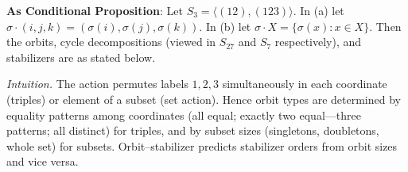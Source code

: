 \documentclass[11pt]{article}
\theoremstyle{definition}
\begin{document}
\noindent\textbf{As Conditional Proposition}: Let $S_3=\langle (12),(123)\rangle$. In (a) let $\sigma\cdot(i,j,k)=(\sigma(i),\sigma(j),\sigma(k))$. In (b) let $\sigma\cdot X=\{\sigma(x):x\in X\}$. Then the orbits, cycle decompositions (viewed in $S_{27}$ and $S_7$ respectively), and stabilizers are as stated below.

\newpage

\dotfill

\emph{Intuition.} The action permutes labels $1,2,3$ simultaneously in each coordinate (triples) or element of a subset (set action). Hence orbit types are determined by equality patterns among coordinates (all equal; exactly two equal—three patterns; all distinct) for triples, and by subset sizes (singletons, doubletons, whole set) for subsets. Orbit–stabilizer predicts stabilizer orders from orbit sizes and vice versa.\\

\dotfill
\end{document}
